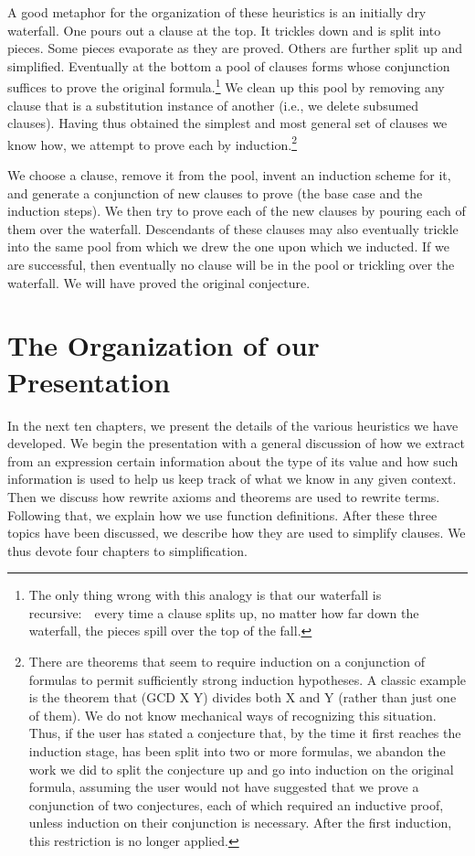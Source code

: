 \documentclass[11pt]{book}
\newcommand{\pubdefaulttextsize}{\large}
\begin{document}
A good  metaphor for the organization of these heuristics is
an initially dry waterfall.  One pours out a clause at the top.
It trickles down and is split into pieces.  Some pieces evaporate as
they are proved.  Others are further split up and simplified.  Eventually
at the bottom a pool of clauses forms whose
conjunction suffices to prove the original formula.\footnote{The only thing wrong with this analogy is that our waterfall is recursive:~~every time a clause splits up, no matter how far down the waterfall, the pieces spill over the top of the fall.}
We clean up this pool by removing any
clause that is a substitution instance of another (i.e.,
we delete subsumed clauses).
Having thus obtained the simplest and most
general set of clauses we know how, we attempt to prove
each  by induction.\footnote{There are theorems that seem to require induction on a conjunction of formulas to permit sufficiently strong induction hypotheses.  A classic example is the theorem that (GCD X Y) divides both X and Y (rather than just one of them).  We do not know mechanical ways of recognizing this situation.  Thus, if the user has stated a conjecture that, by the time it first reaches the induction stage, has been split into two or more formulas, we abandon the work we did to split the conjecture up and go into induction on the original formula, assuming the user would not have suggested that we prove a conjunction of two conjectures, each of which required an inductive proof, unless induction on their conjunction is necessary.  After the first induction, this restriction is no longer applied.}

We choose a clause, remove it from the pool,
invent an induction scheme for it,
and generate a conjunction of new clauses to prove (the base case
and the  induction steps).
We then try to prove each of the new  clauses by pouring each of them
over the waterfall.  Descendants of these clauses may
also eventually trickle into the 
same pool from which we drew the one upon which
we inducted.  If we are successful, then eventually no
clause will be in the pool or trickling over the waterfall.
We will have proved the original conjecture.
\section{The Organization of our Presentation}
\pubdefaulttextsize
In the next ten chapters, we  present the details of the
various heuristics we have developed.
We begin the presentation with a general discussion of how we extract
from an expression certain information about the type of its value and how
such information is used to help us keep track of what we know
in any given context.
Then we discuss how rewrite axioms and theorems are used to
rewrite terms.  Following that, we explain how we use
function definitions.  After these three topics have been discussed,
we  describe how they are used to simplify clauses.
We thus devote four chapters to simplification.
\end{document}

